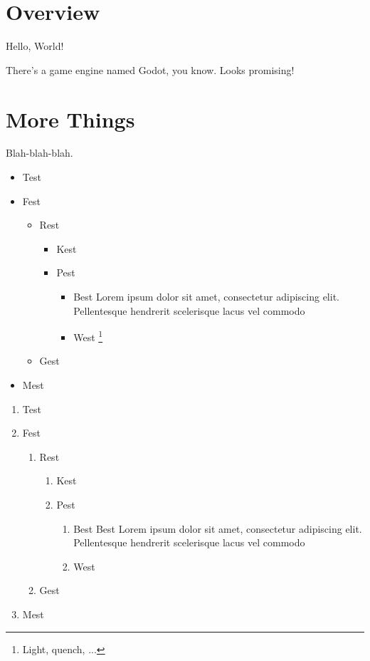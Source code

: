 \section{Overview}

Hello, World!

There's a game engine named Godot\cite{godot}, you know. Looks promising!

\section{More Things}

Blah-blah-blah.

\begin{itemize}
    \item Test
    \item Fest
    \begin{itemize}
        \item Rest
        \begin{itemize}
            \item Kest
            \item Pest
            \begin{itemize}
                \item Best Lorem ipsum dolor sit amet, consectetur adipiscing elit. Pellentesque hendrerit scelerisque lacus vel commodo
                \item West \footnote{Light, quench, ...}
            \end{itemize}
        \end{itemize}
        \item Gest
    \end{itemize}
    \item Mest
\end{itemize}

\begin{enumerate}
    \item Test
    \item Fest
    \begin{enumerate}
        \item Rest
        \begin{enumerate}
            \item Kest
            \item Pest
            \begin{enumerate}
                \item Best Best Lorem ipsum dolor sit amet, consectetur adipiscing elit. Pellentesque hendrerit scelerisque lacus vel commodo
                \item West
            \end{enumerate}
        \end{enumerate}
        \item Gest
    \end{enumerate}
    \item Mest
\end{enumerate}
